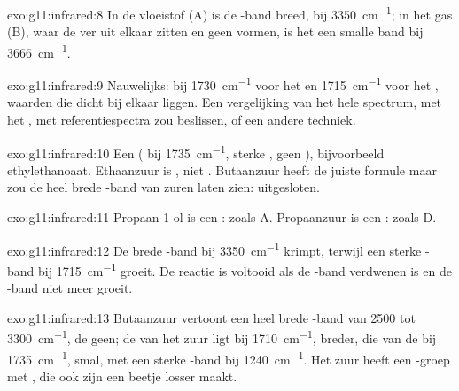 \begin{solution}{exo:g11:infrared:8}
In de vloeistof (A) is de -band breed, bij
\qty{3350}{cm^{-1}}; in het gas (B), waar de  ver uit elkaar
zitten en geen  vormen, is het een smalle band bij
\qty{3666}{cm^{-1}}.
\end{solution}

\begin{solution}{exo:g11:infrared:9}
Nauwelijks: bij \qty{1730}{cm^{-1}} voor het  en
\qty{1715}{cm^{-1}} voor het , waarden die dicht bij elkaar liggen.
Een vergelijking van het hele spectrum, met het , met
referentiespectra zou beslissen, of een andere techniek.
\end{solution}

\begin{solution}{exo:g11:infrared:10}
Een  ( bij \qty{1735}{cm^{-1}}, sterke , geen
), bijvoorbeeld ethylethanoaat. Ethaanzuur is , niet
. Butaanzuur heeft de juiste formule maar zou de heel brede
-band van zuren laten zien: uitgesloten.
\end{solution}

\begin{solution}{exo:g11:infrared:11}
Propaan-1-ol is een : zoals A. Propaanzuur is een :
zoals D.
\end{solution}

\begin{solution}{exo:g11:infrared:12}
De brede -band bij \qty{3350}{cm^{-1}} krimpt, terwijl een sterke
-band bij \qty{1715}{cm^{-1}} groeit. De reactie is voltooid als
de -band verdwenen is en de -band niet meer groeit.
\end{solution}

\begin{solution}{exo:g11:infrared:13}
Butaanzuur vertoont een heel brede -band van 2500 tot
\qty{3300}{cm^{-1}}, de  geen; de  van het zuur ligt bij
\qty{1710}{cm^{-1}}, breder, die van de  bij \qty{1735}{cm^{-1}},
smal, met een sterke -band bij \qty{1240}{cm^{-1}}. Het zuur
heeft een -groep met , die ook zijn  een
beetje losser maakt.
\end{solution}

